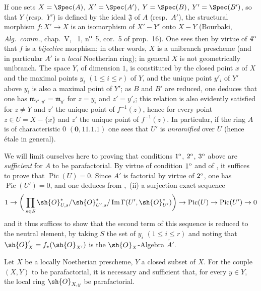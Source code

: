 \begin{example}[21.13.9]
If one sets $X=\Spec(A)$, $X'=\Spec(A')$, $Y=\Spec(B)$, $Y'=\Spec(B')$, so that $Y$ (resp.\ $Y'$) is defined by the ideal $\mathfrak{J}$ of $A$ (resp.\ $A'$), the structural morphism $f:X'\to X$ is an isomorphism of $X'-Y'$ onto $X-Y$ (Bourbaki, \emph{Alg.\ comm.}, chap.~V, \textsection~1, n\textsuperscript{o}~5, cor.~5 of prop.~16).
One sees then by virtue of $4\textsuperscript{o}$ that $f$ is a \emph{bijective} morphism; in other words, $X$ is a unibranch prescheme  (and in particular $A'$ is a \emph{local} Noetherian ring); in general $X$ is not geometrically unibranch.
The space $Y$, of dimension $1$, is constituted by the closed point $x$ of $X$ and the maximal points $y_i$ $(1\leq i\leq r)$ of $Y$, and the unique point $y'_i$ of $Y'$ above $y_i$ is also a maximal point of $Y'$; as $B$ and $B'$ are reduced, one deduces that one has $\mathfrak{m}_{Y',y'}=\mathfrak{m}_{y'}$ for $z=y_i$ and $z'=y'_i$; this relation is also evidently satisfied for $z\neq Y$ and $z'$ the unique point of $f^{-1}(z)$, hence for every point $z\in U=X-\{x\}$ and $z'$ the unique point of $f^{-1}(z)$.
In particular, if the ring $A$ is of characteristic $0$ $(\mathbf{0}, 11.1.1)$ one sees that $U'$ is \emph{unramified} over $U$ (hence étale in general).

We will limit ourselves here to proving that conditions $1\textsuperscript{o}$, $2\textsuperscript{o}$, $3\textsuperscript{o}$ above are \emph{sufficient} for $A$ to be parafactorial.
By virtue of condition $1\textsuperscript{o}$ and of , it suffices to prove that $\operatorname{Pic}(U)=0$.
Since $A'$ is factorial by virtue of $2\textsuperscript{o}$, one has $\operatorname{Pic}(U')=0$, and one deduces from ,~(ii) a surjection exact sequence
\[
  1\to\bigg(\prod_{s\in S}\sh{O}_{U,s}^*/\sh{O}_{U',s}^*/\operatorname{Im}\Gamma(U',\sh{O}_{U'}^*)\bigg)\to\operatorname{Pic}(U)\to\operatorname{Pic}(U')\to 0
\]
and it thus suffices to show that the second term of this sequence is reduced to the neutral element, by taking $S$ the set of $y_i$ $(1\leq i\leq r)$ and noting that $\sh{O}'_X=f_*(\sh{O}_{X'})$ is the $\sh{O}_X$-Algebra $\widetilde{A'}$.
\end{example}


\begin{proposition}[21.13.10]
\label{IV.21.13.10}
Let $X$ be a locally Noetherian prescheme, $Y$ a closed subset of $X$.
For the couple $(X,Y)$ to be parafactorial, it is necessary and sufficient that, for every $y\in Y$, the local ring $\sh{O}_{X,y}$ be parafactorial.
\end{proposition}

